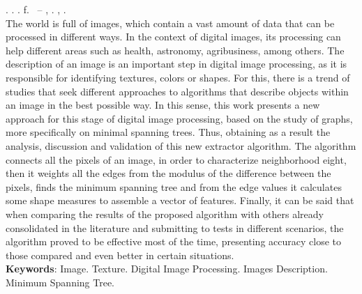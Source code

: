 
\begin{resumo}[ABSTRACT]
\begin{SingleSpacing}

\imprimirautorcitacao. \imprimirtitleabstract. \imprimirdata. \pageref {LastPage} f. \imprimirprojeto\ – \imprimirprograma, \imprimirinstituicao. \imprimirlocal, \imprimirdata.\\

The world is full of images, which contain a vast amount of data that can be processed in different ways. In the context of digital images, its processing can help different areas such as health, astronomy, agribusiness, among others. The description of an image is an important step in digital image processing, as it is responsible for identifying textures, colors or shapes. For this, there is a trend of studies that seek different approaches to algorithms that describe objects within an image in the best possible way. In this sense, this work presents a new approach for this stage of digital image processing, based on the study of graphs, more specifically on minimal spanning trees. Thus, obtaining as a result the analysis, discussion and validation of this new extractor algorithm. The algorithm connects all the pixels of an image, in order to characterize neighborhood eight, then it weights all the edges from the modulus of the difference between the pixels, finds the minimum spanning tree and from the edge values it calculates some shape measures to assemble a vector of features. Finally, it can be said that when comparing the results of the proposed algorithm with others already consolidated in the literature and submitting to tests in different scenarios, the algorithm proved to be effective most of the time, presenting accuracy close to those compared and even better in certain situations.
\\

\textbf{Keywords}: Image. Texture. Digital Image Processing. Images Description. Minimum Spanning Tree.

\end{SingleSpacing}
\end{resumo}

